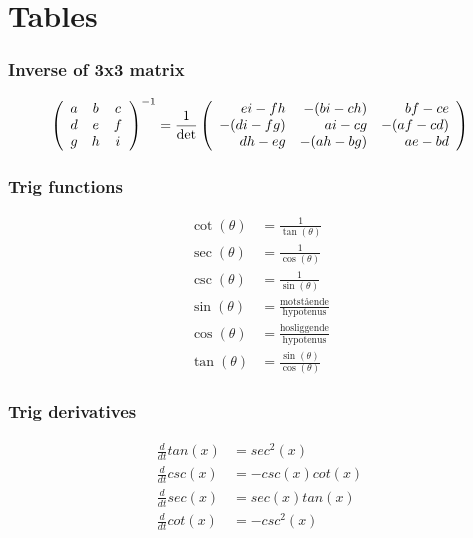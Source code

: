 \part{Tables}

\section{Inverse of 3x3 matrix}
\begin{equation}
\left(\begin{array}{ccc}
    a & b & c\\
    d & e & f\\
    g & h &i
\end{array}\right)^{-1}
=
{\frac{1}{\rm{det}}}
\left(\begin{array}{rrr}
    e i - f h & -(b i - c h) & b f - c e\\
    -(d i - f g) & a i - c g & -(a f -c d)\\
    d h - e g & -(a h - b g) & a e - b d
\end{array}\right)
\end{equation}


\section{Trig functions}
\begin{align}
    \cot(\theta) &= \frac{1}{\tan(\theta)}\\
    \sec(\theta) &= \frac{1}{\cos(\theta)}\\
    \csc(\theta) &= \frac{1}{\sin(\theta)}\\
    \sin(\theta) &= \frac{\text{motstående}}{\text{hypotenus}}\\
    \cos(\theta) &= \frac{\text{hosliggende}}{\text{hypotenus}}\\
    \tan(\theta) &= \frac{\sin(\theta)}{\cos(\theta)}
\end{align}

\section{Trig derivatives}
\begin{align}
    \frac{d}{dt}tan(x) &= sec^2(x) \\
    \frac{d}{dt}csc(x) &= -csc(x)cot(x) \\
    \frac{d}{dt}sec(x) &= sec(x)tan(x) \\
    \frac{d}{dt}cot(x) &= -csc^2(x) \\
\end{align}




